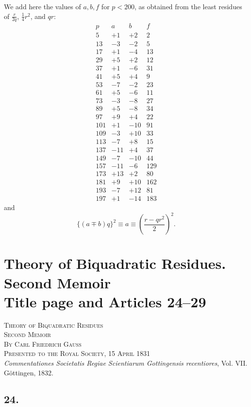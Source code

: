 \documentclass[12pt]{article}
\begin{document}
We add here the values of $a,b,f$ for $p<200$, as obtained from the least residues of $\frac{r}{2q}$, $\frac14r^2$, and $qr$:
\[
\begin{array}{r|r|r|r}
p&a&b&f\\\hline
5&+1&+2&2\\
13&-3&-2&5\\
17&+1&-4&13\\
29&+5&+2&12\\
37&+1&-6&31\\
41&+5&+4&9\\
53&-7&-2&23\\
61&+5&-6&11\\
73&-3&-8&27\\
89&+5&-8&34\\
97&+9&+4&22\\
101&+1&-10&91\\
109&-3&+10&33\\
113&-7&+8&15\\
137&-11&+4&37\\
149&-7&-10&44\\
157&-11&-6&129\\
173&+13&+2&80\\
181&+9&+10&162\\
193&-7&+12&81\\
197&+1&-14&183
\end{array}
\]
and
\[
\{(a\mp b)q\}^2\equiv a\equiv\left(\frac{r-qr^2}{2}\right)^2.
\]



\section*{Theory of Biquadratic Residues. Second Memoir\\
Title page and Articles 24--29}

\begin{center}
\textsc{Theory of Biquadratic Residues}\\
\textsc{Second Memoir}\\[2pt]
\textsc{By Carl Friedrich Gauss}\\
\textsc{Presented to the Royal Society, 15 April 1831}\\
\emph{Commentationes Societatis Regiae Scientiarum Gottingensis recentiores}, Vol. VII.\\
Göttingen, 1832.
\end{center}

\subsection*{24.}
\end{document}
